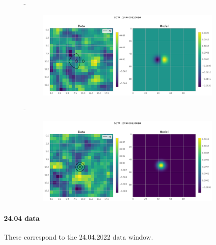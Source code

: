 \documentclass[
	a4paper, %
	10pt, %
	unnumberedsections, %
	twoside, %
]{LTJournalArticle}
\begin{document}
\begin{figure}[H]
\begin{subfigure}{.47\textwidth}
    \end{subfigure}
    \hspace{1em}-
    \begin{subfigure}{.47\textwidth}
        \includegraphics[width=\textwidth]{report/Figures/models/2204/32_psf_notconst.png}
    \end{subfigure}%
    \hspace{1em}-
    \begin{subfigure}{.47\textwidth}
        \centering
        \includegraphics[width=\textwidth]{report/Figures/models/2204/33_psf_notconst.png}
    \end{subfigure}
    \caption{}
    \label{model_const_22}
    \end{figure}
\paragraph{24.04 data}
These correspond to the 24.04.2022 data window.
\end{document}
